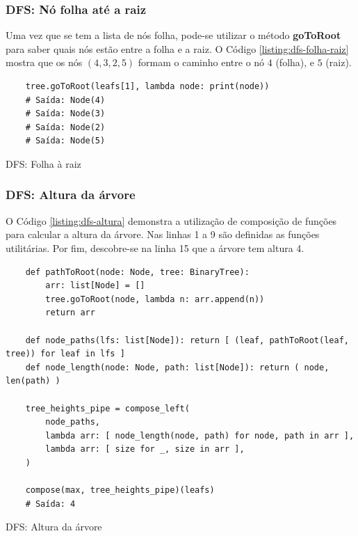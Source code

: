 \subsubsection{DFS: Nó folha até a raiz}

Uma vez que se tem a lista de nós folha, pode-se utilizar o método \textbf{goToRoot} para saber quais nós estão entre a folha e a raiz.
O Código \ref{listing:dfs-folha-raiz} mostra que os nós $(4, 3, 2, 5)$ formam o caminho entre o nó $4$ (folha), e $5$ (raiz).

\begin{listing}[H]
    \begin{verbatim}
    tree.goToRoot(leafs[1], lambda node: print(node))
    # Saída: Node(4)
    # Saída: Node(3)
    # Saída: Node(2)
    # Saída: Node(5)
    \end{verbatim}
    \caption{DFS: Folha à raiz}
    \label{listing:dfs-folha-raiz}
\end{listing}

\subsubsection{DFS: Altura da árvore}

O Código \ref{listing:dfs-altura} demonstra a utilização de composição de funções para calcular a altura da
árvore. Nas linhas 1 a 9 são definidas as funções utilitárias. Por fim, descobre-se na linha 15 que a árvore
tem altura 4.

\begin{listing}[H]
    \begin{verbatim}
    def pathToRoot(node: Node, tree: BinaryTree):
        arr: list[Node] = []
        tree.goToRoot(node, lambda n: arr.append(n))
        return arr

    def node_paths(lfs: list[Node]): return [ (leaf, pathToRoot(leaf, tree)) for leaf in lfs ]
    def node_length(node: Node, path: list[Node]): return ( node, len(path) )

    tree_heights_pipe = compose_left(
        node_paths,
        lambda arr: [ node_length(node, path) for node, path in arr ],
        lambda arr: [ size for _, size in arr ],
    )

    compose(max, tree_heights_pipe)(leafs)
    # Saída: 4
    \end{verbatim}
    \caption{DFS: Altura da árvore}
    \label{listing:dfs-altura}
\end{listing}

